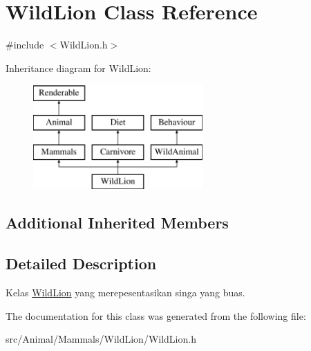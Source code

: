 \hypertarget{classWildLion}{\section{Wild\+Lion Class Reference}
\label{classWildLion}
}


{\ttfamily \#include $<$Wild\+Lion.\+h$>$}

Inheritance diagram for Wild\+Lion\+:\begin{figure}[H]
\begin{center}
\leavevmode
\includegraphics[height=4.000000cm]{classWildLion}
\end{center}
\end{figure}
\subsection*{Additional Inherited Members}


\subsection{Detailed Description}
Kelas \hyperlink{classWildLion}{Wild\+Lion} yang merepesentasikan singa yang buas. 

The documentation for this class was generated from the following file\+:\begin{DoxyCompactItemize}
\item 
src/\+Animal/\+Mammals/\+Wild\+Lion/Wild\+Lion.\+h\end{DoxyCompactItemize}
